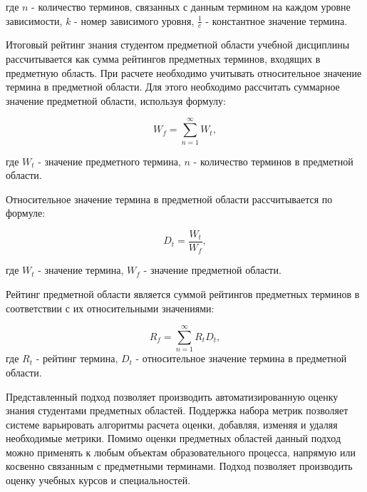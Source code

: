 где \(n\) - количество терминов, связанных с данным термином на каждом уровне зависимости, \(k\) - номер зависимого уровня, \( \frac{1}{e} \) - константное значение термина. 

Итоговый рейтинг знания студентом предметной области учебной дисциплины рассчитывается как сумма рейтингов предметных терминов, входящих в предметную область. При расчете необходимо учитывать относительное значение термина в предметной области. Для этого необходимо рассчитать суммарное значение предметной области, используя формулу:

$$  
    W_f = \sum_{n=1}^{\infty}W_t,
$$

где \(W_t\) - значение предметного термина, \(n\) - количество терминов в предметной области.

Относительное значение термина в предметной области рассчитывается по формуле:

$$
    D_t = \frac{W_t}{W_f},
$$

где \(W_t\) - значение термина, \(W_f\) - значение предметной области.

Рейтинг предметной области является суммой рейтингов предметных терминов в соответствии с их относительными значениями:

$$
    R_f = \sum_{n=1}^{\infty} R_tD_t,
$$
где \(R_t\) - рейтинг термина, \(D_t\) - относительное значение термина в предметной области.

Представленный подход позволяет производить автоматизированную оценку знания студентами предметных областей. Поддержка набора метрик позволяет системе варьировать алгоритмы расчета оценки, добавляя, изменяя и удаляя необходимые метрики. Помимо оценки предметных областей данный подход можно применять к любым объектам образовательного процесса, напрямую или косвенно связанным с предметными терминами. Подход позволяет производить оценку учебных курсов и специальностей.

\clearpage
